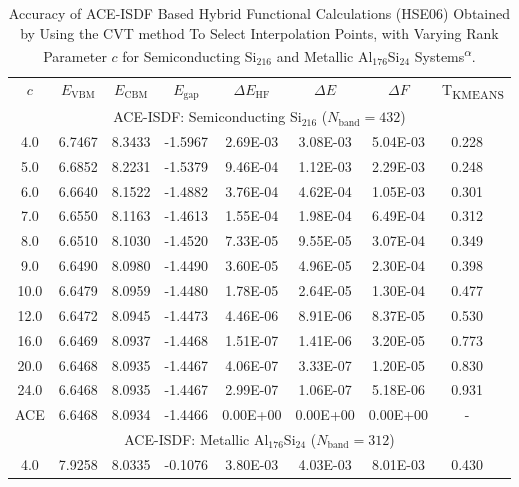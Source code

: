 \begin{table}[htbp]
	\centering
	\caption{Accuracy of ACE\hyp{}ISDF Based Hybrid Functional Calculations 
	(HSE06) Obtained by Using the CVT method To Select Interpolation Points,
	with Varying Rank Parameter $c$ for Semiconducting Si$_{216}$ and Metallic
	Al$_{176}$Si$_{24}$ Systems\textsuperscript{$\alpha$}.}\label{tab:Accuracy}
	\begin{threeparttable}
		\begin{tabular}{cccccccc}
			\rowcolor{lightgray}$c$  &  $E_\text{VBM}$ & $E_\text{CBM}$ & $E_\text{gap}$
			& ${\Delta}E_\text{HF}$ & ${\Delta}E$ & ${\Delta}F$ & T\textsubscript{KMEANS} \\
			\multicolumn{8}{c}{\multirow{2}{*}{ACE-ISDF: Semiconducting Si$_{216}$ ($N_\text{band}=432$)}} \\ \\
			 4.0 & 6.7467 & 8.3433 & -1.5967 &  2.69E-03 &  3.08E-03 &  5.04E-03 &  0.228 \ \\
			 5.0 & 6.6852 & 8.2231 & -1.5379 &  9.46E-04 &  1.12E-03 &  2.29E-03 &  0.248 \ \\
			 6.0 & 6.6640 & 8.1522 & -1.4882 &  3.76E-04 &  4.62E-04 &  1.05E-03 &  0.301 \ \\
			 7.0 & 6.6550 & 8.1163 & -1.4613 &  1.55E-04 &  1.98E-04 &  6.49E-04 &  0.312 \ \\
			 8.0 & 6.6510 & 8.1030 & -1.4520 &  7.33E-05 &  9.55E-05 &  3.07E-04 &  0.349 \ \\
			 9.0 & 6.6490 & 8.0980 & -1.4490 &  3.60E-05 &  4.96E-05 &  2.30E-04 &  0.398 \ \\
			10.0 & 6.6479 & 8.0959 & -1.4480 &  1.78E-05 &  2.64E-05 &  1.30E-04 &  0.477 \ \\
			12.0 & 6.6472 & 8.0945 & -1.4473 &  4.46E-06 &  8.91E-06 &  8.37E-05 &  0.530 \ \\
			16.0 & 6.6469 & 8.0937 & -1.4468 &  1.51E-07 &  1.41E-06 &  3.20E-05 &  0.773 \ \\
			20.0 & 6.6468 & 8.0935 & -1.4467 &  4.06E-07 &  3.33E-07 &  1.20E-05 &  0.830 \ \\
			24.0 & 6.6468 & 8.0935 & -1.4467 &  2.99E-07 &  1.06E-07 &  5.18E-06 &  0.931 \ \\
			 ACE & 6.6468 & 8.0934 & -1.4466 &  0.00E+00 &  0.00E+00 &  0.00E+00 &  - \ \\
			\multicolumn{8}{c}{\multirow{2}{*}{ACE-ISDF: Metallic Al$_{176}$Si$_{24}$ ($N_\text{band} =312$)}} \\ \\
			 4.0 & 7.9258 & 8.0335 & -0.1076 &  3.80E-03 &  4.03E-03 &  8.01E-03 &  0.430 \ \\

\end{tabular}
\end{threeparttable}
\end{table}
